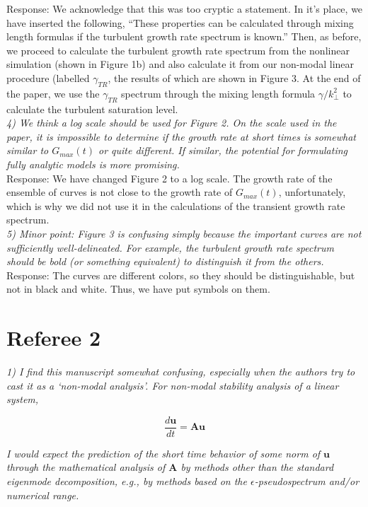 \documentclass[12pt]{article}
\def\beq{\begin{equation}}
\def\eeq{\end{equation}}
\newcommand{\diff}[2]{\frac{d#1}{d#2}}
\begin{document}
Response: We acknowledge that this was too cryptic a statement. In it's place, we have inserted the following, ``These properties can be calculated through mixing length formulas if the turbulent growth rate spectrum is known.'' Then, as before, we proceed to calculate the turbulent growth rate spectrum from the nonlinear simulation (shown in Figure 1b) and also calculate it from our non-modal linear procedure (labelled $\gamma_{TR}$, the results of which are shown in Figure 3. At the end of the paper, we use the $\gamma_{TR}$ spectrum through the mixing length formula $\gamma/k_\perp^2$ to calculate the turbulent saturation level. \\


\emph{4) We think a log scale should be used for Figure 2. On the scale used in the paper, it is
impossible to determine if the growth rate at short times is somewhat similar to $G_{max} (t)$
or quite different. If similar, the potential for formulating fully analytic models is more
promising.} \\

Response: We have changed Figure 2 to a log scale. The growth rate of the ensemble of curves is not close to the growth rate of $G_{max}(t)$, unfortunately, which is why we did not use it in the calculations of the transient growth rate spectrum. \\

\emph{5) Minor point: Figure 3 is confusing simply because the important curves are not
sufficiently well-delineated. For example, the turbulent growth rate spectrum should be
bold (or something equivalent) to distinguish it from the others.} \\

Response: The curves are different colors, so they should be distinguishable, but not in black and white. Thus, we have put symbols on them. \\


\section{Referee 2}

\emph{1) I find this manuscript somewhat confusing, especially when the authors try to cast it as a ‘non-modal analysis’. For non-modal stability analysis of a linear system,}

\beq
\diff{\mathbf{u}}{t} = \mathbf{A u} \nonumber
\eeq

\emph{I would expect the prediction of the short time behavior of some norm of $\mathbf{u}$ through the mathematical analysis of $\mathbf{A}$
by methods other than the standard eigenmode decomposition, e.g., by methods based on the $\epsilon$-pseudospectrum and/or numerical range.}
\end{document}

